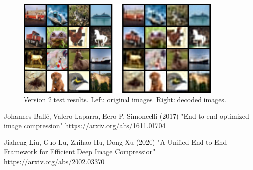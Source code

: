 \documentclass[10pt]{article}
\begin{document}
\begin{center}
\begin{figure}
\caption{Version 2 test results. Left: original images. Right: decoded images.}
\includegraphics[width=0.9\textwidth]{20220530 2 v2.PNG}
\end{figure}
\end{center}


\begin{thebibliography}{9}

Johannes Ballé, Valero Laparra, Eero P. Simoncelli (2017) "End-to-end optimized image compression" https://arxiv.org/abs/1611.01704

Jiaheng Liu, Guo Lu, Zhihao Hu, Dong Xu (2020) "A Unified End-to-End Framework for Efficient Deep Image Compression" https://arxiv.org/abs/2002.03370

\end{thebibliography}
\end{document}
